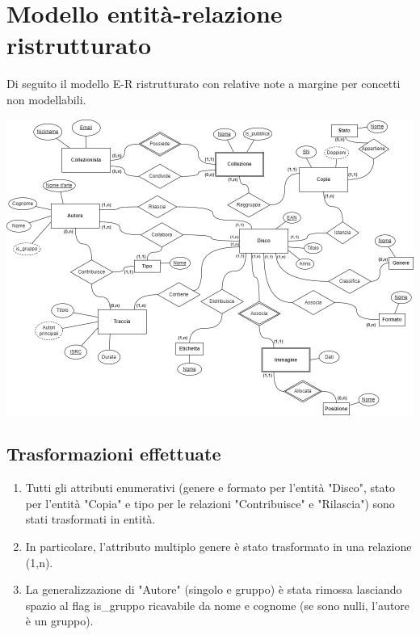 \documentclass{article}
\begin{document}
\pagebreak

\section{Modello entità-relazione ristrutturato}
Di seguito il modello E-R ristrutturato con relative note a margine per concetti non modellabili.
\begin{center}
    \includegraphics[width=1\linewidth]{ER_ristrutturato_ldb.png}
\end{center}

\subsection{Trasformazioni effettuate}
\begin{enumerate}
    \item Tutti gli attributi enumerativi (genere e formato per l'entità "Disco", stato per l'entità "Copia" e tipo per le relazioni "Contribuisce" e "Rilascia") sono stati trasformati in entità.
    \item In particolare, l'attributo multiplo genere è stato trasformato in una relazione (1,n).
    \item La generalizzazione di "Autore" (singolo e gruppo) è stata rimossa lasciando spazio al flag is\_gruppo ricavabile da nome e cognome (se sono nulli, l'autore è un gruppo).
\end{enumerate}

\pagebreak
\end{document}
